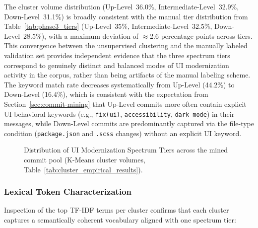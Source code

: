 \documentclass{article}
\begin{document}
The cluster volume distribution (Up-Level~36.0\%,
Intermediate-Level~32.9\%, Down-Level~31.1\%) is broadly consistent
with the manual tier distribution from Table~\ref{tab:phase3_tiers}
(Up-Level~35\%, Intermediate-Level~32.5\%, Down-Level~28.5\%), with
a maximum deviation of $\approx$2.6 percentage points across tiers.
This convergence between the unsupervised clustering and the manually
labeled validation set provides independent evidence that the three
spectrum tiers correspond to genuinely distinct and balanced modes
of UI modernization activity in the corpus, rather than being
artifacts of the manual labeling scheme. The keyword match rate
decreases systematically from Up-Level (44.2\%) to Down-Level
(16.4\%), which is consistent with the expectation from
Section~\ref{sec:commit-mining} that Up-Level commits more often
contain explicit UI-behavioral keywords (e.g., \texttt{fix(ui)},
\texttt{accessibility}, \texttt{dark mode}) in their messages,
while Down-Level commits are predominantly captured via the
file-type condition (\texttt{package.json} and \texttt{.scss}
changes) without an explicit UI keyword.

\begin{figure}[htbp]
\centering
{}
\caption{Distribution of UI Modernization Spectrum Tiers across the
mined commit pool (K-Means cluster volumes, Table~\ref{tab:cluster_empirical_results}).}
\label{fig:spectrum_pie}
\end{figure}

\subsubsection{Lexical Token Characterization}

Inspection of the top TF-IDF terms per cluster confirms that each
cluster captures a semantically coherent vocabulary aligned with one
spectrum tier:
\end{document}
